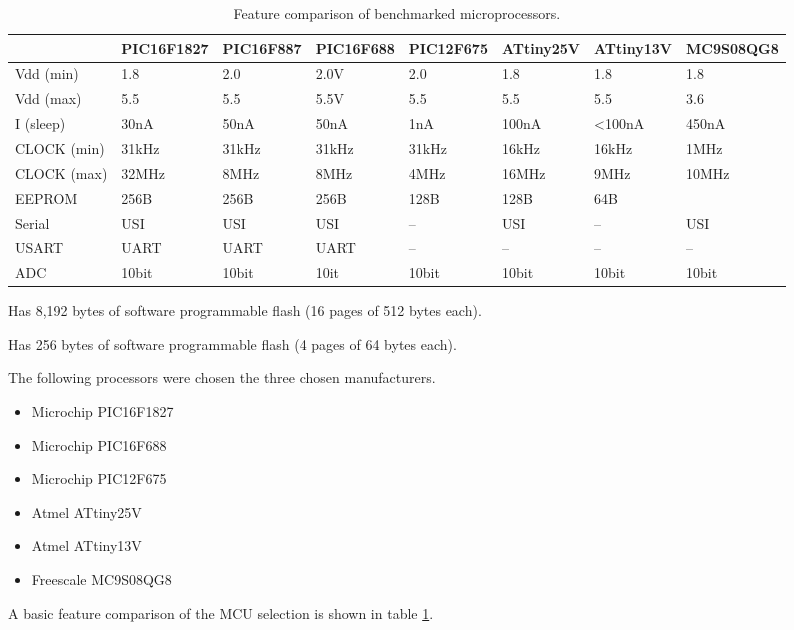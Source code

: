     \begin{table}
      \begin{centering}
        \begin{tabular}{|l|l|l|l|l|l|l|l|}
        \cline{2-8}
        \multicolumn{1}{l|}{} & PIC16F1827  & PIC16F887  & PIC16F688  & PIC12F675  & ATtiny25V  & ATtiny13V  & MC9S08QG8 \tabularnewline
        \hline
        Vdd (min)  & 1.8  & 2.0  & 2.0V  & 2.0  & 1.8  & 1.8  & 1.8 \tabularnewline
        Vdd (max)  & 5.5  & 5.5  & 5.5V  & 5.5  & 5.5  & 5.5  & 3.6 \tabularnewline
        I (sleep)  & 30nA  & 50nA  & 50nA  & 1nA  & 100nA & <100nA & 450nA\tabularnewline
        CLOCK (min)  & 31kHz  & 31kHz & 31kHz & 31kHz & 16kHz & 16kHz & 1MHz \tabularnewline
        CLOCK (max)  & 32MHz  & 8MHz  & 8MHz  & 4MHz  & 16MHz & 9MHz  & 10MHz\tabularnewline
        EEPROM  & 256B  & 256B  & 256B  & 128B  & 128B  & 64B  & \dag{}\tabularnewline
        Serial  & USI  & USI  & USI  & --  & USI  & --  & USI \tabularnewline
        USART  & UART  & UART  & UART  & --  & --  & --  & -- \tabularnewline
        ADC  & 10bit  & 10bit & 10it  & 10bit & 10bit & 10bit & 10bit\tabularnewline
        \hline
        \end{tabular}
      \end{centering}

      \begin{centering}
      \dag Has 8,192 bytes of software programmable flash (16 pages of 512 bytes each).
      \end{centering}

      \begin{centering}
      \ddag Has 256 bytes of software programmable flash (4 pages of 64 bytes each).
      \end{centering}

      \caption{\label{tab:MCUfeaturecomparison} Feature comparison of benchmarked microprocessors.}
    \end{table}

    The following processors were chosen the three chosen manufacturers.
    \begin{itemize}
    \item Microchip PIC16F1827
    \item Microchip PIC16F688
    \item Microchip PIC12F675
    \item Atmel ATtiny25V
    \item Atmel ATtiny13V
    \item Freescale MC9S08QG8
    \end{itemize}
    A basic feature comparison of the MCU selection is shown in table \ref{tab:MCUfeaturecomparison}.





